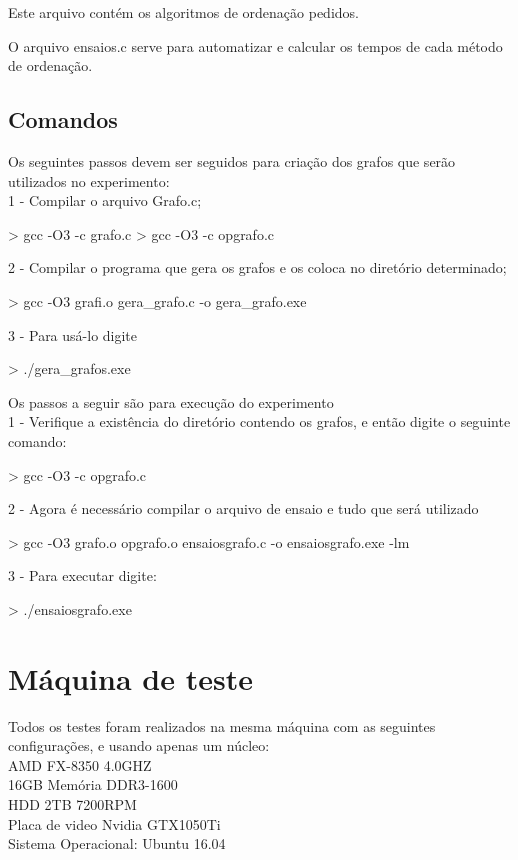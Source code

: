 \documentclass[12pt,a4paper,twoside]{report}
\begin{document}
Este arquivo contém os algoritmos de ordenação pedidos.


O arquivo ensaios.c serve para automatizar e calcular os tempos de cada método de ordenação.


\subsection{Comandos}
Os seguintes passos devem ser seguidos para criação dos grafos que serão utilizados no experimento:\\
1 - Compilar o arquivo Grafo.c;
\begin{terminal}
    > gcc -O3 -c grafo.c
    > gcc -O3 -c opgrafo.c
\end{terminal}
2 - Compilar o programa que gera os grafos e os coloca no diretório determinado;
\begin{terminal}
    > gcc -O3 grafi.o gera_grafo.c -o gera_grafo.exe
\end{terminal}
3 - Para usá-lo digite
\begin{terminal}
    > ./gera_grafos.exe
\end{terminal}

Os passos a seguir são para execução do experimento\\
1 - Verifique a existência do diretório contendo os grafos, e então digite o seguinte comando:
\begin{terminal}
    > gcc -O3 -c opgrafo.c
\end{terminal}
2 - Agora é necessário compilar o arquivo de ensaio e tudo que será utilizado
\begin{terminal}
    > gcc -O3 grafo.o opgrafo.o ensaiosgrafo.c -o ensaiosgrafo.exe -lm
\end{terminal}
3 - Para executar digite:
\begin{terminal}
    > ./ensaiosgrafo.exe
\end{terminal}

\section{Máquina de teste}
Todos os testes foram realizados na mesma máquina com as seguintes configurações, e usando apenas um núcleo:\\
AMD FX-8350 4.0GHZ\\
16GB Memória DDR3-1600\\
HDD 2TB 7200RPM\\
Placa de video Nvidia GTX1050Ti\\
Sistema Operacional: Ubuntu 16.04\\
\end{document}
